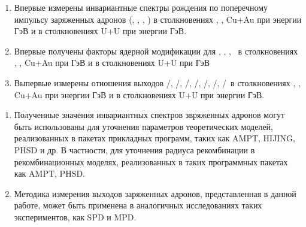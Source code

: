 {\novelty}
\begin{enumerate}[beginpenalty=10000] %
	\item Впервые измерены инвариантные спектры рождения по поперечному импульсу заряженных адронов (\pipm, \Kpm, \prot, \aprot) в столкновениях  \pal, \heau, Cu+Au при энергии  ГэВ и в столкновениях U+U при энергии  ГэВ.
	\item Впервые получены факторы ядерной модификации для \pipm, \Kpm, \prot, \aprot\, в столкновениях  \pal, \heau, Cu+Au при  ГэВ и в столкновениях U+U при  ГэВ
	\item 	Выпервые измерены отношения выходов \pim/\pip, \Km/\Kp, \prot/\aprot, \prot/\pip, \aprot/\pim, \Kp/\pip, \Km/\pim\,  в столкновениях  \pal, \heau, Cu+Au при энергии  ГэВ и в столкновениях U+U при энергии  ГэВ.
\end{enumerate}

{\influence}
\begin{enumerate}[beginpenalty=10000] %
	\item Полученные значения инвариантных спектров звряженных адронов могут быть использованы для уточнения параметров теоретических моделей, реализованных в пакетах прикладных программ, таких как  AMPT, HIJING, PHSD и др. В частности, для уточнения радиуса рекомбинации в рекомбинационных моделях, реализованных в таких программных пакетах как AMPT, PHSD.
	\item Методика измерения выходов заряженных адронов, представленная в данной работе, может быть применена в аналогичных исследованиях таких экспериментов, как SPD и MPD.
	
\end{enumerate}



